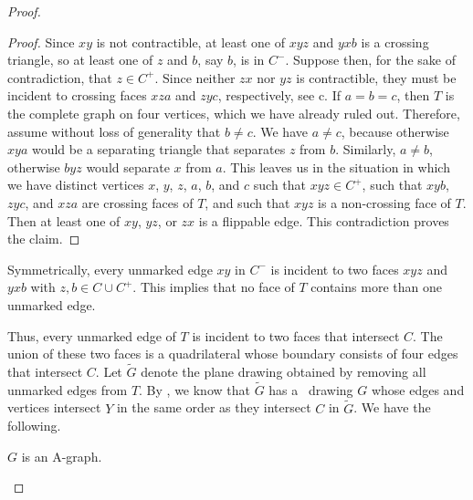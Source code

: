 \begin{proof}
	\begin{proof}
	Since $xy$ is not contractible, at least one of $xyz$ and $yxb$ is a
	crossing triangle, so at least one of $z$ and $b$, say $b$, is in $C^-$.
	Suppose then, for the sake of contradiction, that $z\in C^+$. Since neither $zx$ nor $yz$ is contractible,
	they must be incident to crossing faces $xza$ and $zyc$, respectively,
see c.
	If $a=b=c$, then $T$ is the complete graph on four vertices,
	which we have already ruled out.  Therefore, assume without loss of
	generality that $b\neq c$.  %
	We have $a\neq c$, because otherwise $xya$ would
be a separating triangle that
        separates $z$ from $b$. Similarly, $a\neq b$, otherwise $byz$ would separate $x$ from $a$.	
	This leaves us in the situation in which we have distinct vertices $x$,
	$y$, $z$, $a$, $b$, and $c$ such that $xyz\in C^+$, such that $xyb$, $zyc$, and $xza$
	are crossing faces of $T$, and such that $xyz$ is a non-crossing face of $T$.
	Then at least one of $xy$, $yz$, or $zx$ is a flippable edge. This contradiction proves the claim.
\end{proof}	

	Symmetrically, every unmarked edge $xy$ in $C^-$ is incident to two faces
	$xyz$ and $yxb$ with $z,b\in C \cup C^+$.  This implies that no face of $T$ contains more than one unmarked edge.
	
	Thus, every unmarked edge of $T$ is incident to two faces that intersect $C$. The union of these two faces is a quadrilateral whose boundary consists of four edges that intersect $C$.
	Let $\tilde{G}$ denote the plane drawing obtained by removing all unmarked edges
	from $T$.  By , we know that $\tilde G$ has
	a \Fary\ drawing $G$ whose edges and vertices intersect $Y$ in the
	same order as they intersect $C$ in $\tilde{G}$. We have the following.
	
	\begin{claimx} \label{claim-a-graph}
		$G$ is an A-graph.
	\end{claimx}
	

\end{proof}
